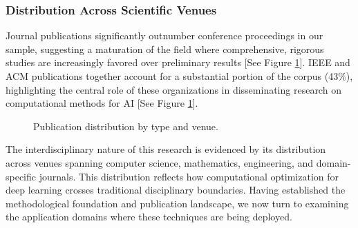 \subsubsection{Distribution Across Scientific Venues}
Journal publications significantly outnumber conference proceedings in our sample, suggesting a maturation of the field where comprehensive, rigorous studies are increasingly favored over preliminary results [See Figure \ref{fig:publication_distribution}]. IEEE and ACM publications together account for a substantial portion of the corpus (43\%), highlighting the central role of these organizations in disseminating research on computational methods for AI [See Figure \ref{fig:publication_distribution}].

\begin{figure}[ht]
\centering
{}
\hspace{0.05\textwidth}
\caption{Publication distribution by type and venue.}
\label{fig:publication_distribution}
\end{figure}

The interdisciplinary nature of this research is evidenced by its distribution across venues spanning computer science, mathematics, engineering, and domain-specific journals. This distribution reflects how computational optimization for deep learning crosses traditional disciplinary boundaries. Having established the methodological foundation and publication landscape, we now turn to examining the application domains where these techniques are being deployed.

